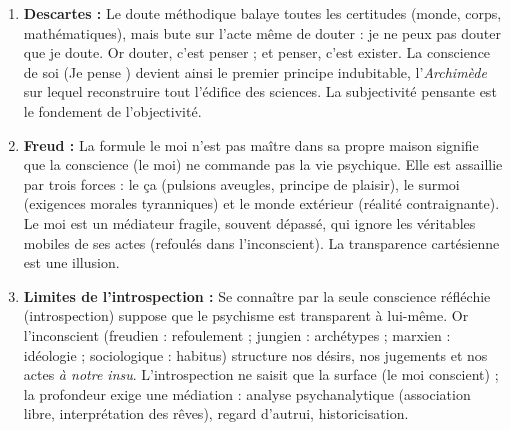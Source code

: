 \documentclass[11pt]{article}
\newcommand{\cle}[1]{{\popxbold\color{popdark}#1}}
\newcounter{popsec}
\newcounter{popsub}
\newcommand{\courssub}[1]{%
  \stepcounter{popsub}%
  \par\vspace{9pt}\noindent{\popxbold\fontsize{11.5}{13}\selectfont\color{popink}{\color{poporange}\thepopsec.\thepopsub}\hspace{6pt}#1}\par\nopagebreak\vspace{4pt}
}
\begin{document}
\courssub{Je m'entraîne}

\begin{corrige}
\begin{enumerate}
\item \textbf{Descartes :} Le doute méthodique balaye toutes les certitudes (monde, corps, mathématiques), mais bute sur l'acte même de douter : je ne peux pas douter que je doute. Or douter, c'est penser ; et penser, c'est exister. La conscience de soi (\guillemotleft Je pense \guillemotright) devient ainsi le \cle{premier principe} indubitable, l'\emph{Archimède} sur lequel reconstruire tout l'édifice des sciences. La subjectivité pensante est le fondement de l'objectivité.
\item \textbf{Freud :} La formule \guillemotleft le moi n'est pas maître dans sa propre maison \guillemotright signifie que la conscience (le moi) ne commande pas la vie psychique. Elle est assaillie par trois forces : le \cle{ça} (pulsions aveugles, principe de plaisir), le \cle{surmoi} (exigences morales tyranniques) et le \cle{monde extérieur} (réalité contraignante). Le moi est un médiateur fragile, souvent dépassé, qui ignore les véritables mobiles de ses actes (refoulés dans l'inconscient). La transparence cartésienne est une illusion.
\item \textbf{Limites de l'introspection :} Se connaître par la seule conscience réfléchie (introspection) suppose que le psychisme est transparent à lui-même. Or l'inconscient (freudien : refoulement ; jungien : archétypes ; marxien : idéologie ; sociologique : habitus) structure nos désirs, nos jugements et nos actes \emph{à notre insu}. L'introspection ne saisit que la surface (le moi conscient) ; la profondeur exige une médiation : analyse psychanalytique (association libre, interprétation des rêves), regard d'autrui, historicisation.
\end{enumerate}
\end{corrige}
\end{document}
